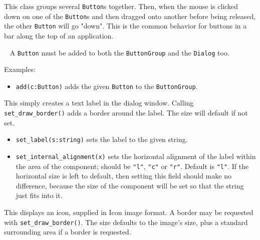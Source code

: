 \medskip{}

This class groups several  \texttt{Button}s together. Then, when the mouse is
clicked down on one of the  \texttt{Button}s and then dragged onto another before
being released, the other  \texttt{Button} will go
"down". This is the common behavior for
buttons in a bar along the top of an application.

\medskip{}\ {\sffamily
A  \texttt{Button} must be added to both the  \texttt{ButtonGroup} and the  \texttt{Dialog} too.}\medskip

Examples:


\begin{itemize}
\item\noindent\texttt{add(c:Button)} adds the given  \texttt{Button} to the  \texttt{ButtonGroup}.
\end{itemize}

\medskip{}

This simply creates a text label in the dialog window. Calling
\texttt{set\_draw\_border()} adds a border around the label. The size will
default if not set.

\begin{itemize}
\item\noindent\texttt{set\_label(s:string)} sets the label to the given string.

\item\noindent\texttt{set\_internal\_alignment(x)} sets the horizontal alignment of the label
within the area of the component; should be \texttt{"l"}, \texttt{"c"} or \texttt{"r"}. Default is
\texttt{"l"}. If the horizontal size is left to
default, then setting this field should make no difference, because the
size of the component will be set so that the string just fits into it.
\end{itemize}

\newpage
{}

This displays an icon, supplied in Icon image format. A border may be
requested with \texttt{set\_draw\_border()}. The size defaults to the
image's size, plus a standard surrounding area if a
border is requested.

